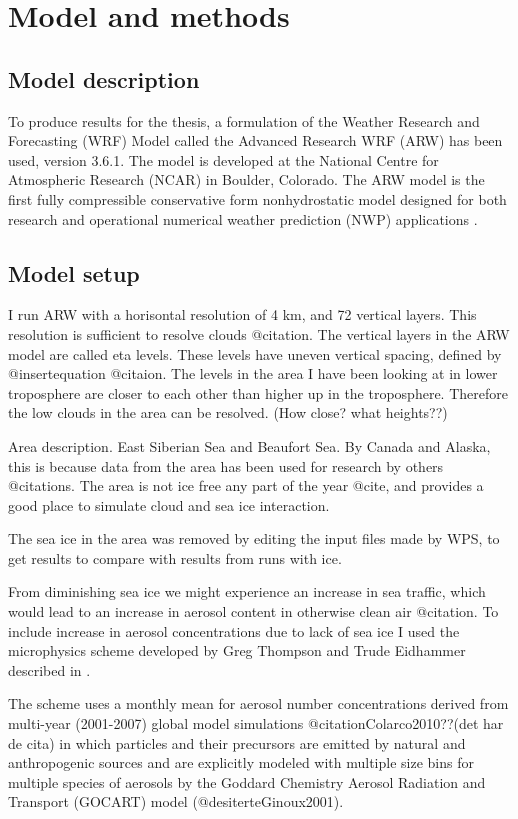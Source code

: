 \chapter{Model and methods}
\label{chap:modmet}
\section{Model description}
\label{sec:modeldes}
To produce results for the thesis, a formulation of the Weather Research and Forecasting (WRF) Model called the Advanced Research WRF (ARW) has been used, version 3.6.1. The model is developed at the National Centre for Atmospheric Research (NCAR) in Boulder, Colorado. The ARW model is the first fully compressible conservative form nonhydrostatic model designed for both research and operational numerical weather prediction (NWP) applications \citep{Skamarock2008}.
\section{Model setup}
\label{sec:modelset}
I run ARW with a horisontal resolution of 4 km, and 72 vertical layers. This resolution is sufficient to resolve clouds @citation.
The vertical layers in the ARW model are called eta levels. These levels have uneven vertical spacing, defined by @insertequation @citaion. The levels in the area I have been looking at in lower troposphere are closer to each other than higher up in the troposphere. Therefore the low clouds in the area can be resolved. (How close? what heights??)

Area description. East Siberian Sea and Beaufort Sea. By Canada and Alaska, this is because data from the area has been used for research by others @citations. The area is not ice free any part of the year @cite, and provides a good place to simulate cloud and sea ice interaction.

The sea ice in the area was removed by editing the input files made by WPS, to get results to compare with results from runs with ice.

From diminishing sea ice we might experience an increase in sea traffic, which would lead to an increase in aerosol content in otherwise clean air @citation. To include increase in aerosol concentrations due to lack of sea ice I used the microphysics scheme developed by Greg Thompson and Trude Eidhammer described in \cite{Thompson2014}.

The scheme uses a monthly mean for aerosol number concentrations derived from multi-year (2001-2007) global model simulations @citationColarco2010??(det har de cita) in which particles and their precursors are emitted by natural and anthropogenic sources and are explicitly modeled with multiple size bins for multiple species of aerosols by the Goddard Chemistry Aerosol Radiation and Transport (GOCART) model (@desiterteGinoux2001).